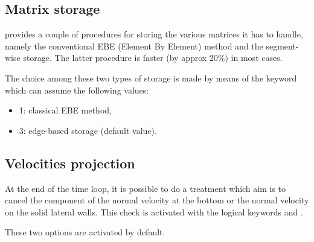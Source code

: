 \subsection{Matrix storage}

 provides a couple of procedures for storing the various matrices it
has to handle, namely the conventional EBE (Element By Element) method and the
segment-wise storage. The latter procedure is faster (by approx 20\%) in most
cases.

The choice among these two types of storage is made by means of the keyword
 which can assume the following values:

\begin{itemize}
\item 1: classical EBE method,

\item 3: edge-based storage (default value).
\end{itemize}

\subsection{Velocities projection}

At the end of the time loop, it is possible to do a treatment which aim is to
cancel the component of the normal velocity at the bottom or the normal
velocity on the solid lateral walls. This check is activated with the logical
keywords  and
.

These two options are activated by default.
